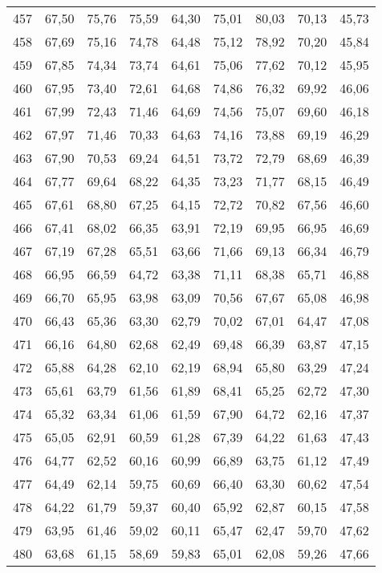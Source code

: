 \begin{longtable}{c c c c c c c c c}
457	& 67,50	& 75,76	& 75,59	& 64,30	& 75,01	& 80,03	& 70,13	& 45,73 \\
458	& 67,69	& 75,16	& 74,78	& 64,48	& 75,12	& 78,92	& 70,20	& 45,84 \\
459	& 67,85	& 74,34	& 73,74	& 64,61	& 75,06	& 77,62	& 70,12	& 45,95 \\
460	& 67,95	& 73,40	& 72,61	& 64,68	& 74,86	& 76,32	& 69,92	& 46,06 \\
461	& 67,99	& 72,43	& 71,46	& 64,69	& 74,56	& 75,07	& 69,60	& 46,18 \\
462	& 67,97	& 71,46	& 70,33	& 64,63	& 74,16	& 73,88	& 69,19	& 46,29 \\
463	& 67,90	& 70,53	& 69,24	& 64,51	& 73,72	& 72,79	& 68,69	& 46,39 \\
464	& 67,77	& 69,64	& 68,22	& 64,35	& 73,23	& 71,77	& 68,15	& 46,49 \\
465	& 67,61	& 68,80	& 67,25	& 64,15	& 72,72	& 70,82	& 67,56	& 46,60 \\
466	& 67,41	& 68,02	& 66,35	& 63,91	& 72,19	& 69,95	& 66,95	& 46,69 \\
467	& 67,19	& 67,28	& 65,51	& 63,66	& 71,66	& 69,13	& 66,34	& 46,79 \\
468	& 66,95	& 66,59	& 64,72	& 63,38	& 71,11	& 68,38	& 65,71	& 46,88 \\
469	& 66,70	& 65,95	& 63,98	& 63,09	& 70,56	& 67,67	& 65,08	& 46,98 \\
470	& 66,43	& 65,36	& 63,30	& 62,79	& 70,02	& 67,01	& 64,47	& 47,08 \\
471	& 66,16	& 64,80	& 62,68	& 62,49	& 69,48	& 66,39	& 63,87	& 47,15 \\
472	& 65,88	& 64,28	& 62,10	& 62,19	& 68,94	& 65,80	& 63,29	& 47,24 \\
473	& 65,61	& 63,79	& 61,56	& 61,89	& 68,41	& 65,25	& 62,72	& 47,30 \\
474	& 65,32	& 63,34	& 61,06	& 61,59	& 67,90	& 64,72	& 62,16	& 47,37 \\
475	& 65,05	& 62,91	& 60,59	& 61,28	& 67,39	& 64,22	& 61,63	& 47,43 \\
476	& 64,77	& 62,52	& 60,16	& 60,99	& 66,89	& 63,75	& 61,12	& 47,49 \\
477	& 64,49	& 62,14	& 59,75	& 60,69	& 66,40	& 63,30	& 60,62	& 47,54 \\
478	& 64,22	& 61,79	& 59,37	& 60,40	& 65,92	& 62,87	& 60,15	& 47,58 \\
479	& 63,95	& 61,46	& 59,02	& 60,11	& 65,47	& 62,47	& 59,70	& 47,62 \\
480	& 63,68	& 61,15	& 58,69	& 59,83	& 65,01	& 62,08	& 59,26	& 47,66 \\

\end{longtable}
